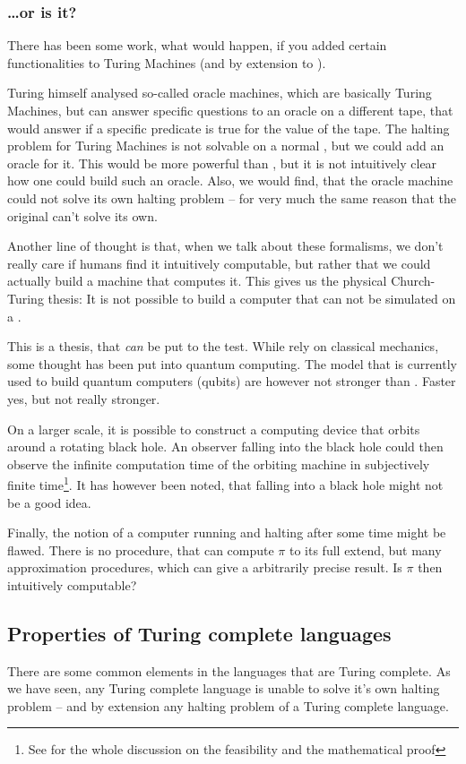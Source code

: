 \subsubsection{\dots or is it?}
There has been some work, what would happen, if you added certain 
functionalities to Turing Machines (and by extension to \WHILE). 

Turing himself analysed so-called oracle machines, which are basically Turing 
Machines, but can answer specific questions to an oracle on a different tape, 
that would answer if a specific predicate is true for the value of the tape.
The halting problem for Turing Machines is not solvable on a normal \TM, but 
we could add an oracle for it. This would be more powerful than \TM, but it 
is not intuitively clear how one could build such an oracle. Also, we would 
find, that the oracle machine could not solve its own halting problem -- for 
very much the same reason that the original \TM can't solve its own.

Another line of thought is that, when we talk about these formalisms, we 
don't really care if humans find it intuitively computable, but rather that 
we could actually build a machine that computes it. This gives us the 
physical Church-Turing thesis: It is not possible to build a computer that 
can not be simulated on a \TM.

This is a thesis, that \emph{can} be put to the test. While \TM rely on 
classical mechanics, some thought has been put into quantum computing. The 
model that is currently used to build quantum computers (qubits) are however
not stronger than \TM. Faster yes, but not really stronger.

On a larger scale, it is possible to construct a computing device that orbits 
around a rotating black hole. An observer falling into the black hole could 
then observe the infinite computation time of the orbiting machine in
subjectively finite time\footnote{See \cite{etesi2002blackhole} for the whole
discussion on the feasibility and the mathematical proof}. It has however been
noted, that falling into a black hole might not be a good idea.

Finally, the notion of a computer running and halting after some time might 
be flawed. There is no procedure, that can compute $\pi$ to its full extend, 
but many approximation procedures, which can give a arbitrarily precise 
result. Is $\pi$ then intuitively computable?

\subsection{Properties of Turing complete languages}
There are some common elements in the languages that are Turing complete. As we
have seen, any Turing complete language is unable to solve it's own halting
problem -- and by extension any halting problem of a Turing complete language.

